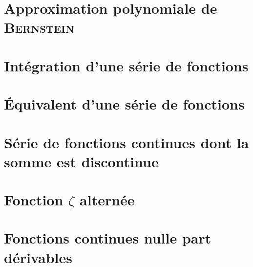 \section{Approximation polynomiale de \textsc{Bernstein}}


\section{Intégration d'une série de fonctions}


\section{Équivalent d'une série de fonctions}


\section{Série de fonctions continues dont la somme est discontinue}


\section{Fonction \texorpdfstring{$\zeta$}{zêta} alternée}


\section{Fonctions continues nulle part dérivables}

